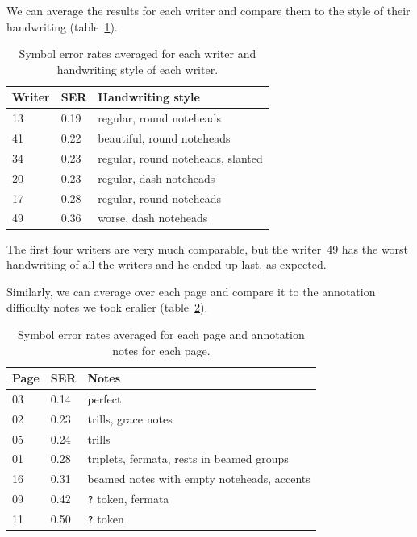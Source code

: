 We can average the results for each writer and compare them to the style of their handwriting (table~\ref{tab6:SerAverageForWriters}).

\begin{table}[h] \centering
\begin{tabular}{lll}
\toprule
\textbf{Writer} & \textbf{SER} & \textbf{Handwriting style} \\
\midrule
13 & 0.19 & regular, round noteheads          \\
41 & 0.22 & beautiful, round noteheads        \\
34 & 0.23 & regular, round noteheads, slanted \\
20 & 0.23 & regular, dash noteheads           \\
17 & 0.28 & regular, round noteheads          \\
49 & 0.36 & worse, dash noteheads             \\
\bottomrule
\end{tabular}
\caption{Symbol error rates averaged for each writer and handwriting style of each writer.}
\label{tab6:SerAverageForWriters}
\end{table}

The first four writers are very much comparable, but the writer~49 has the worst handwriting of all the writers and he ended up last, as expected.

Similarly, we can average over each page and compare it to the annotation difficulty notes we took eralier (table~\ref{tab6:SerAverageForPages}).

\begin{table}[h] \centering
\begin{tabular}{lll}
\toprule
\textbf{Page} & \textbf{SER} & \textbf{Notes} \\
\midrule
03 & 0.14 & perfect                                    \\
02 & 0.23 & trills, grace notes                        \\
05 & 0.24 & trills                                     \\
01 & 0.28 & triplets, fermata, rests in beamed groups  \\
16 & 0.31 & beamed notes with empty noteheads, accents \\
09 & 0.42 & \verb`?` token, fermata                    \\
11 & 0.50 & \verb`?` token                             \\
\bottomrule
\end{tabular}
\caption{Symbol error rates averaged for each page and annotation notes for each page.}
\label{tab6:SerAverageForPages}
\end{table}

